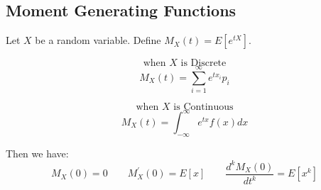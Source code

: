 \subsection{Moment Generating Functions}

Let $X$ be a random variable. Define $M_X(t) = E[e^{tX}]$.
\begin{minipage}{.23\textwidth}
$$\text{when }X\text{ is Discrete}$$
$$M_X(t) = \sum_{i=1}^{\infty} e^{tx_i}p_i$$
\end{minipage}
\begin{minipage}{.23\textwidth}
$$\text{when }X \text{ is Continuous}$$
$$M_X(t) = \int_{-\infty}^{\infty} e^{tx}f(x)dx$$
\end{minipage}

Then we have:
$$M_X(0) = 0 \qquad M_{X}^{'}(0) = E[x] \qquad  \frac{d^k M_{X} (0)}{d t^k} = E[x^k]$$
